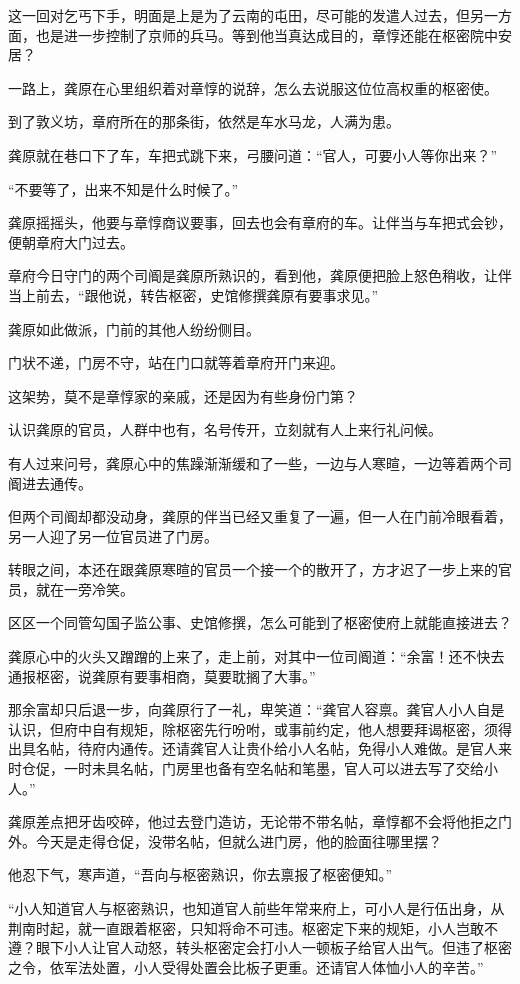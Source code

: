 这一回对乞丐下手，明面是上是为了云南的屯田，尽可能的发遣人过去，但另一方面，也是进一步控制了京师的兵马。等到他当真达成目的，章惇还能在枢密院中安居？

一路上，龚原在心里组织着对章惇的说辞，怎么去说服这位位高权重的枢密使。

到了敦义坊，章府所在的那条街，依然是车水马龙，人满为患。

龚原就在巷口下了车，车把式跳下来，弓腰问道：“官人，可要小人等你出来？”

“不要等了，出来不知是什么时候了。”

龚原摇摇头，他要与章惇商议要事，回去也会有章府的车。让伴当与车把式会钞，便朝章府大门过去。

章府今日守门的两个司阍是龚原所熟识的，看到他，龚原便把脸上怒色稍收，让伴当上前去，“跟他说，转告枢密，史馆修撰龚原有要事求见。”

龚原如此做派，门前的其他人纷纷侧目。

门状不递，门房不守，站在门口就等着章府开门来迎。

这架势，莫不是章惇家的亲戚，还是因为有些身份门第？

认识龚原的官员，人群中也有，名号传开，立刻就有人上来行礼问候。

有人过来问号，龚原心中的焦躁渐渐缓和了一些，一边与人寒暄，一边等着两个司阍进去通传。

但两个司阍却都没动身，龚原的伴当已经又重复了一遍，但一人在门前冷眼看着，另一人迎了另一位官员进了门房。

转眼之间，本还在跟龚原寒暄的官员一个接一个的散开了，方才迟了一步上来的官员，就在一旁冷笑。

区区一个同管勾国子监公事、史馆修撰，怎么可能到了枢密使府上就能直接进去？

龚原心中的火头又蹭蹭的上来了，走上前，对其中一位司阍道：“余富！还不快去通报枢密，说龚原有要事相商，莫要耽搁了大事。”

那余富却只后退一步，向龚原行了一礼，卑笑道：“龚官人容禀。龚官人小人自是认识，但府中自有规矩，除枢密先行吩咐，或事前约定，他人想要拜谒枢密，须得出具名帖，待府内通传。还请龚官人让贵仆给小人名帖，免得小人难做。是官人来时仓促，一时未具名帖，门房里也备有空名帖和笔墨，官人可以进去写了交给小人。”

龚原差点把牙齿咬碎，他过去登门造访，无论带不带名帖，章惇都不会将他拒之门外。今天是走得仓促，没带名帖，但就么进门房，他的脸面往哪里摆？

他忍下气，寒声道，“吾向与枢密熟识，你去禀报了枢密便知。”

“小人知道官人与枢密熟识，也知道官人前些年常来府上，可小人是行伍出身，从荆南时起，就一直跟着枢密，只知将命不可违。枢密定下来的规矩，小人岂敢不遵？眼下小人让官人动怒，转头枢密定会打小人一顿板子给官人出气。但违了枢密之令，依军法处置，小人受得处置会比板子更重。还请官人体恤小人的辛苦。”

